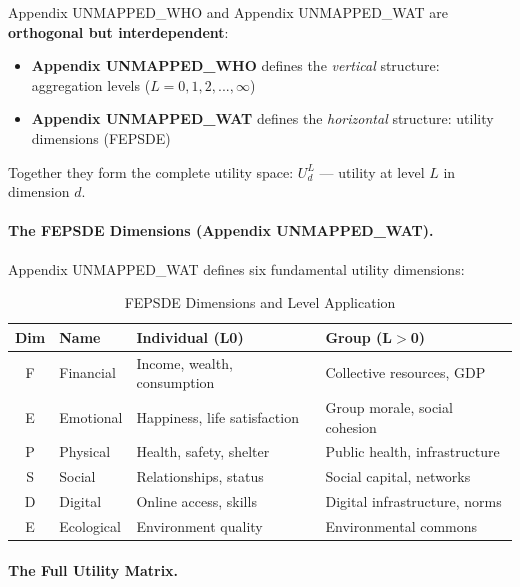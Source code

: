 \begin{tcolorbox}[colback=blue!5!white, colframe=blue!75!black, title=The AAA-C Connection: Levels $\times$ Dimensions]
Appendix UNMAPPED_WHO and Appendix UNMAPPED_WAT are \textbf{orthogonal but interdependent}:
\begin{itemize}[nosep]
\item \textbf{Appendix UNMAPPED_WHO} defines the \textit{vertical} structure: aggregation levels ($L = 0, 1, 2, ..., \infty$)
\item \textbf{Appendix UNMAPPED_WAT} defines the \textit{horizontal} structure: utility dimensions (FEPSDE)
\end{itemize}

Together they form the complete utility space: $U^L_d$ --- utility at level $L$ in dimension $d$.
\end{tcolorbox}

\paragraph{The FEPSDE Dimensions (Appendix UNMAPPED_WAT).}

Appendix UNMAPPED_WAT defines six fundamental utility dimensions:

\begin{table}[htbp]
\centering
\caption{FEPSDE Dimensions and Level Application}
\label{tab:aaa-fepsde-levels}
\renewcommand{\arraystretch}{1.3}
\begin{tabular}{@{}clp{5cm}p{4cm}@{}}
\toprule
\textbf{Dim} & \textbf{Name} & \textbf{Individual (L0)} & \textbf{Group (L$>$0)} \\
\midrule
F & Financial & Income, wealth, consumption & Collective resources, GDP \\
E & Emotional & Happiness, life satisfaction & Group morale, social cohesion \\
P & Physical & Health, safety, shelter & Public health, infrastructure \\
S & Social & Relationships, status & Social capital, networks \\
D & Digital & Online access, skills & Digital infrastructure, norms \\
E & Ecological & Environment quality & Environmental commons \\
\bottomrule
\end{tabular}
\end{table}

\paragraph{The Full Utility Matrix.}

